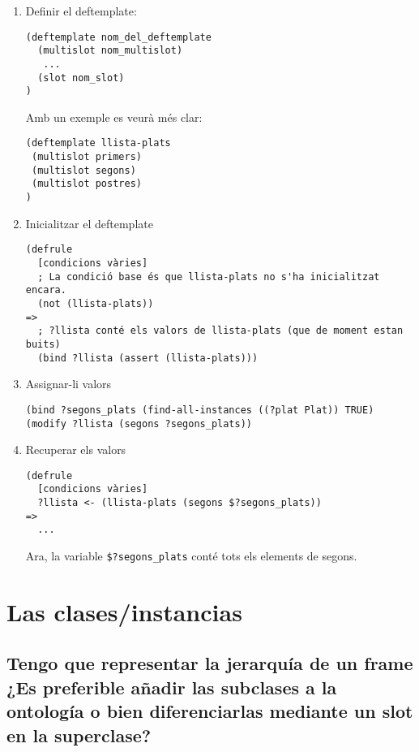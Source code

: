 \documentclass[11pt,svgnames]{scrbook}
\begin{document}
\begin{enumerate}
 \item  Definir el deftemplate:


\begin{verbatim}
(deftemplate nom_del_deftemplate
  (multislot nom_multislot)
   ...
  (slot nom_slot)
)
\end{verbatim}

Amb un exemple es veurà més clar:

\begin{verbatim}
(deftemplate llista-plats
 (multislot primers)
 (multislot segons)
 (multislot postres)
)
\end{verbatim}

\item Inicialitzar el deftemplate

\begin{verbatim}
(defrule
  [condicions vàries]
  ; La condició base és que llista-plats no s'ha inicialitzat encara.
  (not (llista-plats))
=>
  ; ?llista conté els valors de llista-plats (que de moment estan buits)
  (bind ?llista (assert (llista-plats)))
\end{verbatim}

\item  Assignar-li valors

\begin{verbatim}
(bind ?segons_plats (find-all-instances ((?plat Plat)) TRUE)
(modify ?llista (segons ?segons_plats))
\end{verbatim}

\item Recuperar els valors

\begin{verbatim}
(defrule
  [condicions vàries]
  ?llista <- (llista-plats (segons $?segons_plats))
=>
  ...
\end{verbatim}

Ara, la variable \texttt{\$?segons\_plats} conté tots els elements de segons.


\end{enumerate}



\section{Las clases/instancias}

\subsection{Tengo que representar la jerarquía de un frame ¿Es preferible añadir
las
subclases a la ontología o bien diferenciarlas mediante un slot en la
superclase?}
\end{document}
